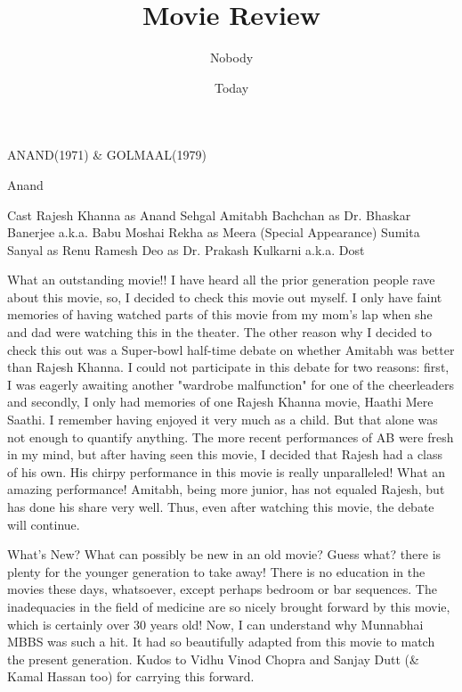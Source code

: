 \documentclass{article}
\title{Movie Review}
\author{Nobody}
\date{Today}
\begin{document}
\maketitle

\LARGE{ANAND(1971) \& GOLMAAL(1979)}

\Large{Anand}


Cast\newline
Rajesh Khanna as Anand Sehgal\newline
Amitabh Bachchan as Dr. Bhaskar Banerjee a.k.a. Babu Moshai\newline
Rekha as Meera (Special Appearance)\newline
Sumita Sanyal as Renu\newline
Ramesh Deo as Dr. Prakash Kulkarni a.k.a. Dost\newline
\newline

What an outstanding movie!! I have heard all the prior generation people rave about this movie, so, I decided to check this movie out myself. I only have faint memories of having watched parts of this movie from my mom's lap when she and dad were watching this in the theater. The other reason why I decided to check this out was a Super-bowl half-time debate on whether Amitabh was better than Rajesh Khanna. I could not participate in this debate for two reasons: first, I was eagerly awaiting another "wardrobe malfunction" for one of the cheerleaders and secondly, I only had memories of one Rajesh Khanna movie, Haathi Mere Saathi. I remember having enjoyed it very much as a child. But that alone was not enough to quantify anything. The more recent performances of AB were fresh in my mind, but after having seen this movie, I decided that Rajesh had a class of his own. His chirpy performance in this movie is really unparalleled! What an amazing performance! Amitabh, being more junior, has not equaled Rajesh, but has done his share very well. Thus, even after watching this movie, the debate will continue.

What's New? What can possibly be new in an old movie? Guess what? there is plenty for the younger generation to take away! There is no education in the movies these days, whatsoever, except perhaps bedroom or bar sequences. The inadequacies in the field of medicine are so nicely brought forward by this movie, which is certainly over 30 years old! Now, I can understand why Munnabhai MBBS was such a hit. It had so beautifully adapted from this movie to match the present generation. Kudos to Vidhu Vinod Chopra and Sanjay Dutt (\& Kamal Hassan too) for carrying this forward.
\end{document}
